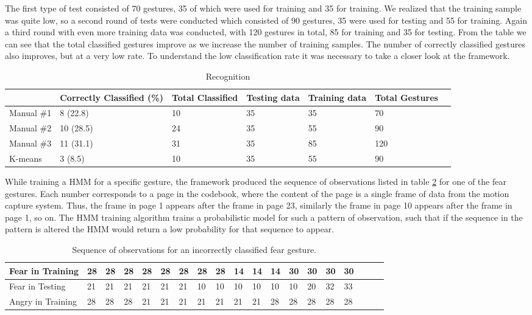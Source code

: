\documentclass[]{report}   %
\begin{document}
The first type of test consisted of 70 gestures, 35 of which were used for training and 35 for training. We realized that the training sample was quite low, so a second round of tests were conducted which consisted of 90 gestures, 35 were used for testing and 55 for training. Again a third round with even more training data was conducted, with 120 gestures in total, 85 for training and 35 for testing. From the table we can see that the total classified gestures improve as we increase the number of training samples. The number of correctly classified gestures also improves, but at a very low rate. To understand the low classification rate it was necessary to take a closer look at the framework. 
\begin{table}[htbp]
	\centering
		\begin{tabular}{|l|l|l|l|l|l|l|}
		\hline
		    			& Correctly Classified (\%) & Total Classified & Testing data & Training data & Total Gestures\\
		\hline
			Manual \#1	& 8	(22.8) 	& 10	& 35 &	35 &	70\\
			Manual \#2	& 10 (28.5)	& 24 	& 35 & 	55 &	90\\
			Manual \#3	& 11 (31.1)	& 31 	& 35 & 	85 &	120\\
			K-means 	& 3 (8.5)	& 10	& 35 & 	55 &	90\\
		\hline
		\end{tabular}
	\caption{Recognition}
	\label{tab:manual}
\end{table}

While training a HMM for a specific gesture, the framework produced the sequence of observations listed in table \ref{tab:fearseq} for one of the fear gestures. Each number corresponds to a page in the codebook, where the content of the page is a single frame of data from the motion capture system. Thus, the frame in page 1 appears after the frame in page 23, similarly the frame in page 10 appears after the frame in page 1, so on. The HMM training algorithm trains a probabilistic model for such a pattern of observation, such that if the sequence in the pattern is altered the HMM would return a low probability for that sequence to appear.

\begin{table}[htbp]
	\centering
		\begin{tabular}{|l|*{18}{l|}}
		\hline
		 	Fear in Training	&28	&28	&28	&28	&28	&28	&28	&28	&14	&14	&14	&30	&30	&30	&30	\\ \hline
		 	Fear in Testing		&21	&21	&21	&21	&21	&21	&10	&10	&10	&10	&10	&10	&20	&32	&33 \\ \hline
			Angry in Training	&28	&28	&28	&21	&21	&21	&21	&21	&21	&21	&28	&28	&28	&28	&28 \\
		\hline
		\end{tabular}
	\caption{Sequence of observations for an incorrectly classified fear gesture.}
	\label{tab:fearseq}
\end{table}
\end{document}
